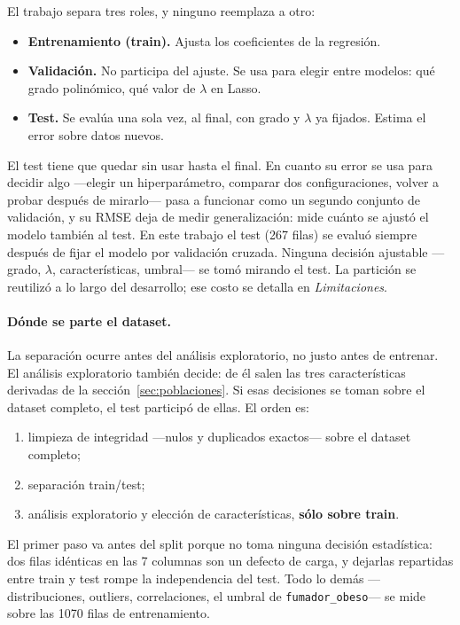 \documentclass[11pt,a4paper]{article}
\begin{document}
El trabajo separa tres roles, y ninguno reemplaza a otro:

\begin{itemize}
  \item \textbf{Entrenamiento (train).} Ajusta los coeficientes de la regresión.
  \item \textbf{Validación.} No participa del ajuste. Se usa para elegir entre modelos: qué
        grado polinómico, qué valor de $\lambda$ en Lasso.
  \item \textbf{Test.} Se evalúa una sola vez, al final, con grado y $\lambda$ ya fijados.
        Estima el error sobre datos nuevos.
\end{itemize}

El test tiene que quedar sin usar hasta el final. En cuanto su error se usa para decidir algo
---elegir un hiperparámetro, comparar dos configuraciones, volver a probar después de
mirarlo--- pasa a funcionar como un segundo conjunto de validación, y su RMSE deja de medir
generalización: mide cuánto se ajustó el modelo también al test. En este trabajo el test (267
filas) se evaluó siempre después de fijar el modelo por validación cruzada. Ninguna decisión
ajustable ---grado, $\lambda$, características, umbral--- se tomó mirando el test. La
partición se reutilizó a lo largo del desarrollo; ese costo se detalla en \emph{Limitaciones}.

\paragraph{Dónde se parte el dataset.}
La separación ocurre antes del análisis exploratorio, no justo antes de entrenar. El análisis
exploratorio también decide: de él salen las tres características derivadas de la
sección~\ref{sec:poblaciones}. Si esas decisiones se toman sobre el dataset completo, el test
participó de ellas. El orden es:
\begin{enumerate}[label=\arabic*.]
  \item limpieza de integridad ---nulos y duplicados exactos--- sobre el dataset completo;
  \item separación train/test;
  \item análisis exploratorio y elección de características, \textbf{sólo sobre train}.
\end{enumerate}
El primer paso va antes del split porque no toma ninguna decisión estadística: dos filas
idénticas en las 7 columnas son un defecto de carga, y dejarlas repartidas entre train y test
rompe la independencia del test. Todo lo demás ---distribuciones, outliers, correlaciones, el
umbral de \texttt{fumador\_obeso}--- se mide sobre las 1070 filas de entrenamiento.
\end{document}
